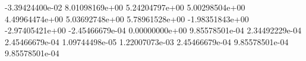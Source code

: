  -3.39424400e-02
 8.01098169e+00
 5.24204797e+00
 5.00298504e+00
 4.49964474e+00
 5.03692748e+00
 5.78961528e+00
 -1.98351843e+00
 -2.97405421e+00
 -2.45466679e-04
 0.00000000e+00
 9.85578501e-04
 2.34492229e-04
 2.45466679e-04
 1.09744498e-05
 1.22007073e-03
 2.45466679e-04
 9.85578501e-04
 9.85578501e-04
